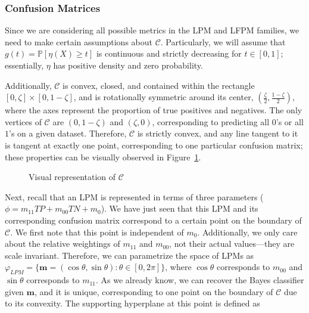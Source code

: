 \documentclass[
  letterpaper,
  numbers=noenddot,
  DIV=11]{scrreprt}
\theoremstyle{plain}
\theoremstyle{definition}
\theoremstyle{plain}
\theoremstyle{remark}
\begin{document}
\subsubsection*{Confusion Matrices}\label{sec-confusion-matrices}

Since we are considering all possible metrics in the LPM and LFPM
families, we need to make certain assumptions about \(\mathcal{C}\).
Particularly, we will assume that \(g(t) = \mathbb{P}[\eta(X) \geq t]\)
is continuous and strictly decreasing for \(t \in [0, 1]\); essentially,
\(\eta\) has positive density and zero probability.

Additionally, \(\mathcal{C}\) is convex, closed, and contained within
the rectangle \([0, \zeta] \times [0, 1-\zeta]\), and is rotationally
symmetric around its center, \((\frac{\zeta}{2}, \frac{1-\zeta}{2})\),
where the axes represent the proportion of true positives and negatives.
The only vertices of \(\mathcal{C}\) are \((0, 1-\zeta)\) and
\((\zeta, 0)\), corresponding to predicting all \(0\)'s or all \(1\)'s
on a given dataset. Therefore, \(\mathcal{C}\) is strictly convex, and
any line tangent to it is tangent at exactly one point, corresponding to
one particular confusion matrix; these properties can be visually
observed in Figure~\ref{fig-c}.

\begin{figure}


\caption{\label{fig-c}Visual representation of \(\mathcal{C}\)}

\end{figure}%

Next, recall that an LPM is represented in terms of three parameters
(\(\phi = m_{11}TP + m_{00}TN + m_0\)). We have just seen that this LPM
and its corresponding confusion matrix correspond to a certain point on
the boundary of \(\mathcal{C}\). We first note that this point is
independent of \(m_0\). Additionally, we only care about the relative
weightings of \(m_{11}\) and \(m_{00}\), not their actual values---they
are scale invariant. Therefore, we can parametrize the space of LPMs as
\(\varphi_{LPM} = \{\mathbf{m} = (\cos \theta, \sin \theta) : \theta \in [0, 2\pi]\}\),
where \(\cos \theta\) corresponds to \(m_{00}\) and \(\sin \theta\)
corresponds to \(m_{11}\). As we already know, we can recover the Bayes
classifier given \(\mathbf{m}\), and it is unique, corresponding to one
point on the boundary of \(\mathcal{C}\) due to its convexity. The
supporting hyperplane at this point is defined as
\end{document}
